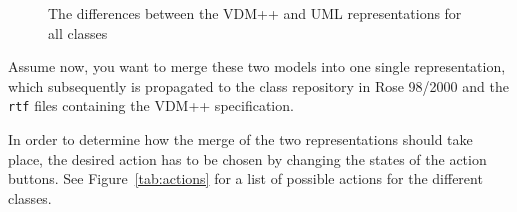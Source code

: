 \documentclass[\pformat,12pt]{article}
\newcommand{\vdmpp}{VDM++}
\newcommand{\rose}{Rose 98/2000}
\begin{document}
\begin{figure}[htb]
\begin{center}
\mbox{}
\caption{The differences between the \vdmpp{} and UML representations for all classes\label{fig:diffs}}
\end{center}
\end{figure}
Assume now, you want to merge these two models into one single
representation, which subsequently is propagated to the class
repository in \rose{} and the {\tt rtf} files containing the \vdmpp{}
specification.  

In order to determine how the merge of the two representations should
take place, the desired action has to be chosen by changing the states
of the action buttons. See Figure~\ref{tab:actions} for a list of
possible actions for the different classes.
\end{document}
